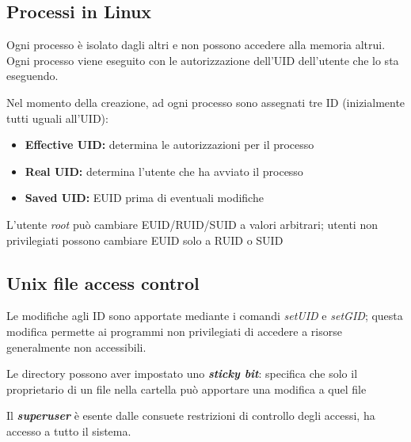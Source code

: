 \subsection{Processi in Linux}
Ogni processo è isolato dagli altri e non possono accedere alla memoria altrui. Ogni processo viene 
eseguito con le autorizzazione dell'UID dell'utente che lo sta eseguendo. 

\noindent Nel momento della creazione, ad ogni processo sono assegnati tre ID (inizialmente tutti uguali 
all'UID):
\begin{itemize}
    \item \textbf{Effective UID:} determina le autorizzazioni per il processo 
    \item \textbf{Real UID:} determina l'utente che ha avviato il processo 
    \item \textbf{Saved UID:} EUID prima di eventuali modifiche
\end{itemize}

\noindent L'utente \textit{root} può cambiare EUID/RUID/SUID a valori arbitrari; utenti non privilegiati
possono cambiare EUID solo a RUID o SUID

\subsection{Unix file access control}
Le modifiche agli ID sono apportate mediante i comandi \textit{setUID} e \textit{setGID}; questa modifica 
permette ai programmi non privilegiati di accedere a risorse generalmente non accessibili.

\noindent Le directory possono aver impostato uno \textit{\textbf{sticky bit}}: specifica che solo il proprietario di un file nella cartella
può apportare una modifica a quel file 

\noindent Il \textit{\textbf{superuser}} è esente dalle consuete restrizioni di controllo degli accessi, ha 
accesso a tutto il sistema. 